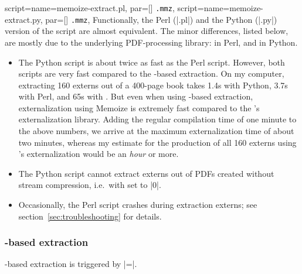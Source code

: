 \documentclass[a4paper,11pt]{article}
\begin{document}
\begin{doc}{
    script={name=memoize-extract.pl, par=[] \texttt{.mmz}},
    script={name=memoize-extract.py, par=[] \texttt{.mmz}},
  }
  Functionally, the Perl (|.pl|) and the Python (|.py|) version of the script
  are almost equivalent.  The minor differences, listed below, are mostly due
  to the underlying PDF-processing library:
   in Perl, and
   in Python.
  \begin{itemize}
  \item The Python script is about twice as fast as the Perl script.  However,
    both scripts are very fast compared to the -based extraction.
    On my computer, extracting 160 externs out of a 400-page book takes 1.4s
    with Python, 3.7s with Perl, and 65s with .  But even when
    using -based extraction, externalization using Memoize is
    extremely fast compared to the \TikZ's externalization library.  Adding
    the regular compilation time of one minute to the above numbers, we arrive
    at the maximum externalization time of about two minutes, whereas my
    estimate for the production of all 160 externs using \TikZ's
    externalization would be an \emph{hour} or more.
  \item The Python script cannot extract externs out of PDFs created without
    stream compression, i.e.\ with 
     set to |0|.
  \item Occasionally, the Perl script crashes during extraction externs; see
    section~\ref{sec:troubleshooting} for details.
  \end{itemize}
\end{doc}

\subsubsection{\texorpdfstring{}{TeX}-based extraction}
\label{sec:ref:extraction-tex}

-based extraction is triggered by
|=|.
\end{document}
